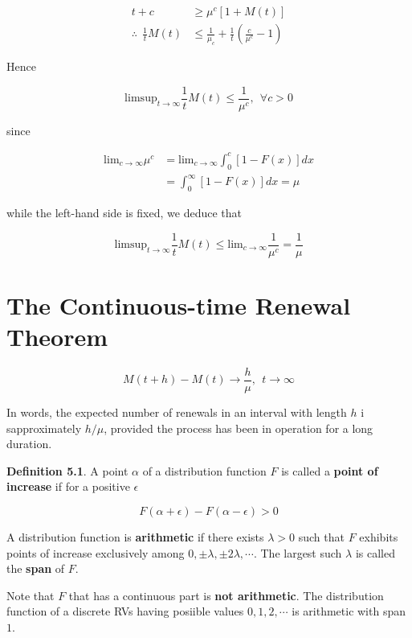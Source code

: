 \documentclass[12pt]{article}
\theoremstyle{nonumberbreak}
\begin{document}
$$
\begin{aligned}
t + c &\ge \mu^c \left[ 1 + M(t) \right] \\[8pt]
\therefore \ \ \frac{1}{t} M(t) &\le \frac{1}{\mu_c} + \frac{1}{t} \left( \frac{c}{\mu^c} -1 \right)
\end{aligned}
$$


Hence 

$$
\mathrm{lim sup}_{t \to \infty} \frac{1}{t} M(t) \le \frac{1}{\mu^c}, \ \ \forall c > 0
$$

since 

$$
\begin{aligned}
\mathrm{lim}_{c\to \infty} \mu^c &=\mathrm{lim}_{c \to \infty} \int_0^c \left[ 1- F(x) \right] dx  \\[8pt]
&= \int_0^\infty [1-F(x)] dx = \mu
\end{aligned}
$$

while the left-hand side is fixed, we deduce that

$$
\mathrm{lim sup}_{t \to \infty} \frac{1}{t} M(t) \le \mathrm{lim}_{c \to \infty} \frac{1}{\mu^c} = \frac{1}{\mu}
$$



\section{The Continuous-time Renewal Theorem}

$$
M(t + h) - M(t) \to \frac{h}{\mu}, \ \ t \to \infty
$$

In words, the expected number of renewals in an interval with length $h$ i sapproximately $h/\mu$, provided the process has been in operation for a long duration. 



\begin{theorem}
\textbf{Definition 5.1}. A point $\alpha$ of a distribution function $F$ is called a \textbf{point of increase} if for a positive $\epsilon$  

$$
F(\alpha + \epsilon) - F(\alpha - \epsilon) > 0
$$
\end{theorem}

A distribution function is \textbf{arithmetic} if there exists $\lambda >0$ such that $F$ exhibits points of increase exclusively among $0, \pm \lambda, \pm 2\lambda, \cdots$. The largest such $\lambda$ is called the \textbf{span} of $F$.

Note that $F$ that has a continuous part is \textbf{not arithmetic}. The distribution function of a discrete RVs having posiible values $0,1,2,\cdots$ is arithmetic with span $1$. 
\end{document}
